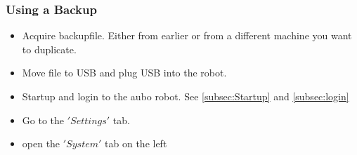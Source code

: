 \documentclass{article}
\begin{document}
\subsubsection{Using a Backup}
\begin{itemize}
\item Acquire backupfile. Either from earlier or from a different machine you want to duplicate.
\item Move file to USB and plug USB into the robot.
\item Startup and login to the aubo robot. See \ref{subsec:Startup} and \ref{subsec:login}
\item Go to the $'Settings'$ tab.
\begin{center}
\end{center}
\item open the $'System'$ tab on the left
\begin{center}

\end{center}
\end{itemize}
\end{document}
